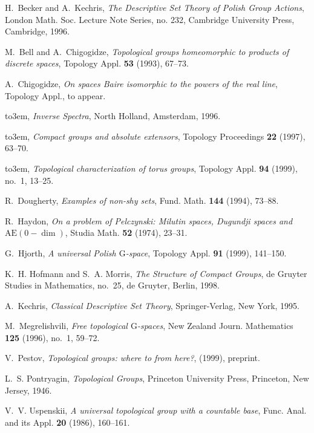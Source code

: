 \documentclass[12pt,draft]{amsart}
\theoremstyle{plain}
\theoremstyle{definition}
\numberwithin{equation}{section}
\begin{document}
\providecommand{\bysame}{\leavevmode\hbox to3em{\hrulefill}\thinspace}
\begin{thebibliography}{10}

H.~Becker and A.~Kechris, \emph{The {D}escriptive {S}et {T}heory of {P}olish
  {G}roup {A}ctions}, London Math. Soc. Lecture Note Series, no. 232, Cambridge
  University Press, Cambridge, 1996.

M.~Bell and A.~Chigogidze, \emph{Topological groups homeomorphic to products of
  discrete spaces}, Topology Appl. \textbf{53} (1993), 67--73.

A.~Chigogidze, \emph{On spaces {B}aire isomorphic to the powers of the real
  line}, Topology Appl., to appear.

\bysame, \emph{Inverse {S}pectra}, North Holland, Amsterdam, 1996.

\bysame, \emph{Compact groups and absolute extensors}, Topology Proceedings
  \textbf{22} (1997), 63--70.

\bysame, \emph{Topological characterization of torus groups}, Topology Appl.
  \textbf{94} (1999), no.~1, 13--25.

R.~Dougherty, \emph{Examples of non-shy sets}, Fund. Math. \textbf{144} (1994),
  73--88.

R.~Haydon, \emph{On a problem of {P}elczynski: {M}ilutin spaces, {D}ugundji
  spaces and $\text{AE}(0-\dim )$}, Studia Math. \textbf{52} (1974), 23--31.

G.~Hjorth, \emph{A universal {P}olish $\text{G}$-space}, Topology Appl.
  \textbf{91} (1999), 141--150.

K.~H. Hofmann and S.~A. Morris, \emph{The {S}tructure of {C}ompact {G}roups},
  de {G}ruyter {S}tudies in {M}athematics, no.~25, de {G}ruyter, Berlin, 1998.

A.~Kechris, \emph{Classical {D}escriptive {S}et {T}heory}, Springer-Verlag, New
  York, 1995.

M.~Megrelishvili, \emph{Free topological $\text{G}$-spaces}, New Zealand Journ.
  Mathematics \textbf{125} (1996), no.~1, 59--72.

V.~Pestov, \emph{Topological groups: where to from here?},  (1999), preprint.

L.~S. Pontryagin, \emph{Topological {G}roups}, Princeton University Press,
  Princeton, New Jersey, 1946.

V.~V. Uspenskii, \emph{A universal topological group with a countable base},
  Func. Anal. and its Appl. \textbf{20} (1986), 160--161.

\end{thebibliography}





\end{document}
